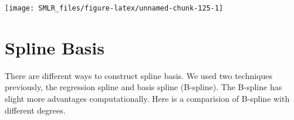 \documentclass[
]{book}
\newenvironment{Shaded}{\begin{snugshade}}{\end{snugshade}}
\newcommand{\AttributeTok}[1]{\textcolor[rgb]{0.13,0.29,0.53}{#1}}
\newcommand{\DecValTok}[1]{\textcolor[rgb]{0.00,0.00,0.81}{#1}}
\newcommand{\FunctionTok}[1]{\textcolor[rgb]{0.13,0.29,0.53}{\textbf{#1}}}
\newcommand{\NormalTok}[1]{#1}
\newcommand{\OtherTok}[1]{\textcolor[rgb]{0.56,0.35,0.01}{#1}}
\newcommand{\SpecialCharTok}[1]{\textcolor[rgb]{0.81,0.36,0.00}{\textbf{#1}}}
\newcommand{\StringTok}[1]{\textcolor[rgb]{0.31,0.60,0.02}{#1}}
\theoremstyle{definition}
\theoremstyle{definition}
\theoremstyle{definition}
\theoremstyle{definition}
\theoremstyle{remark}
\begin{document}
\begin{Shaded}
\end{Shaded}

\begin{center}\texttt{[image: SMLR\_files/figure-latex/unnamed-chunk-125-1]} \end{center}

\hypertarget{spline-basis}{%
\section{Spline Basis}\label{spline-basis}}

There are different ways to construct spline basis. We used two techniques previously, the regression spline and basis spline (B-spline). The B-spline has slight more advantages computationally. Here is a comparision of B-spline with different degrees.
\end{document}
